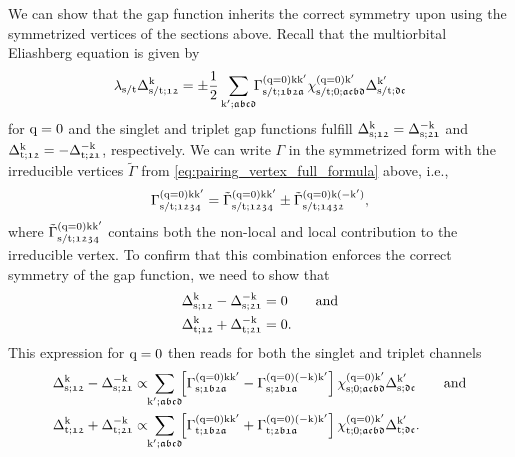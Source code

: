\documentclass[main.tex]{subfiles}
\begin{document}
We can show that the gap function inherits the correct symmetry upon using the symmetrized vertices of the sections above. Recall that the multiorbital Eliashberg equation is given by 
\begin{align}
	\lambda_{\text{s}/\text{t}}\Delta_{\text{s}/\text{t};\mathfrak{12}}^{\text{k}}=\pm\frac{1}{2}\sum_{\text{k}';\mathfrak{abcd}}\!\!\Gamma^{(\text{q}=0)\text{k}\text{k}'}_{\text{s}/\text{t};\mathfrak{1b2a}}\chi^{(\text{q}=0)\text{k}'}_{\text{s}/\text{t};0;\mathfrak{acbd}}\Delta_{\text{s}/\text{t};\mathfrak{dc}}^{\text{k}'}
\end{align}
for $\text{q}=0$ and the singlet and triplet gap functions fulfill $\Delta_{\text{s};\mathfrak{12}}^{\text{k}}=\Delta_{\text{s};\mathfrak{21}}^{-\text{k}}$ and $\Delta_{\text{t};\mathfrak{12}}^{\text{k}}=-\Delta_{\text{t};\mathfrak{21}}^{-\text{k}}$, respectively. 
We can write $\Gamma$ in the symmetrized form with the irreducible vertices $\tilde{\Gamma}$ from \eqref{eq:pairing_vertex_full_formula} above, i.e.,
\begin{align}\label{eq:symmetrization_pairing_vertex}
	\Gamma^{(\text{q}=0)\text{k}\text{k}'}_{\text{s}/\text{t};\mathfrak{1234}} = \tilde{\Gamma}^{(\text{q}=0)\text{k}\text{k}'}_{\text{s}/\text{t};\mathfrak{1234}}\pm \tilde{\Gamma}^{(\text{q}=0)\text{k}(-\text{k}')}_{\text{s}/\text{t};\mathfrak{1432}},
\end{align}
where $\tilde{\Gamma}^{(\text{q}=0)\text{k}\text{k}'}_{\text{s}/\text{t};\mathfrak{1234}}$ contains both the non-local and local contribution to the irreducible vertex. To confirm that this combination enforces the correct symmetry of the gap function, we need to show that
\begin{subequations}
\begin{align}
	\Delta_{\text{s};\mathfrak{12}}^{\text{k}}-\Delta_{\text{s};\mathfrak{21}}^{-\text{k}}&=0\qquad\text{and}\\
	\Delta_{\text{t};\mathfrak{12}}^{\text{k}}+\Delta_{\text{t};\mathfrak{21}}^{-\text{k}}&=0.
\end{align}
\end{subequations}
This expression for $\text{q}=0$ then reads for both the singlet and triplet channels
\begin{subequations}
\begin{align}
	\Delta_{\sing;\mathfrak{12}}^{\k}-\Delta_{\sing;\mathfrak{21}}^{-\k}&\propto\!\!\sum_{\kp;\mathfrak{abcd}}\!\! \left [\Gamma^{(\q=0)\k\kp}_{\sing;\mathfrak{1b2a}}-\Gamma^{(\q=0)(-\k)\kp}_{\sing;\mathfrak{2b1a}}\right ]\chi^{(\q=0)\kp}_{\sing;0;\mathfrak{acbd}}\Delta_{\sing;\mathfrak{dc}}^{\kp}\label{eq:symmetrization_delta_first_formula_singlet}\qqand\\
	\Delta_{\trip;\mathfrak{12}}^{\k}+\Delta_{\trip;\mathfrak{21}}^{-\k}&\propto\!\!\sum_{\kp;\mathfrak{abcd}}\!\! \left [\Gamma^{(\q=0)\k\kp}_{\trip;\mathfrak{1b2a}}+\Gamma^{(\q=0)(-\k)\kp}_{\trip;\mathfrak{2b1a}}\right ]\chi^{(\q=0)\kp}_{\trip;0;\mathfrak{acbd}}\Delta_{\trip;\mathfrak{dc}}^{\kp}\label{eq:symmetrization_delta_first_formula_triplet}.
\end{align}
\end{subequations}
\end{document}
